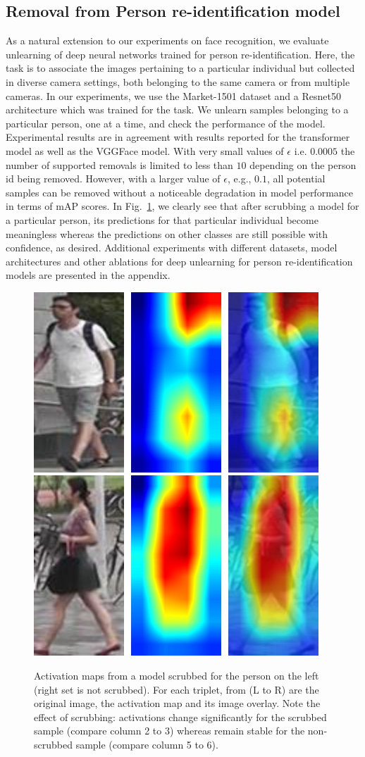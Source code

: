 \subsection{Removal from Person re-identification model}
As a natural extension to our experiments on face recognition, we evaluate unlearning of deep neural networks trained for person re-identification. Here, the task is to associate the images pertaining to a particular individual but collected in diverse camera settings, both belonging to the same camera or from multiple cameras. In our experiments, we use the Market-1501 dataset \cite{zheng2015scalable} and a Resnet50 architecture which was trained for the task. We unlearn samples belonging to a particular person, one at a time, and check the performance of the model. Experimental results are in agreement with results reported for the transformer model as well as the VGGFace model. With very small values of $\epsilon$ i.e. $0.0005$ the number of supported removals is limited to less than $10$ depending on the person id being removed. However, with a larger value of $\epsilon$, e.g., $0.1$, all potential samples can be removed without a noticeable degradation in model performance in terms of mAP scores. In Fig.~\ref{fig:reid}, we clearly see that after scrubbing a model for a particular person, its predictions for that particular individual become meaningless whereas the predictions on other classes are still possible with confidence, as desired. Additional experiments with different datasets, model architectures and other ablations for deep unlearning for person re-identification models are presented in the appendix.

\begin{figure}[!tb]
    \centering
    \includegraphics[width=0.49\columnwidth]{5_unlearn/figs/scrub/0006_c3s3_075694_00.jpg}
     \includegraphics[width=0.49\columnwidth]{5_unlearn/figs/scrub/0101_c5s1_021926_00.jpg}
    \caption{\label{fig:reid}Activation maps from a model scrubbed for the person on the left (right set is not scrubbed). For each triplet, from (L to R) are the original image, the activation map and its image overlay. Note the effect of scrubbing: activations change significantly for the scrubbed sample (compare column 2 to 3) whereas remain stable for the non-scrubbed sample (compare column 5 to 6).}
\end{figure}

